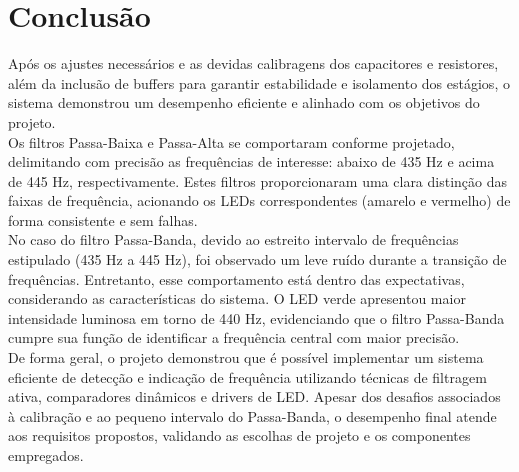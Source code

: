 \documentclass[a4paper, 12pt]{article}
\begin{document}






\newpage
\section{Conclusão}

Após os ajustes necessários e as devidas calibragens dos capacitores e resistores, além da inclusão de buffers para garantir estabilidade e isolamento dos estágios, o sistema demonstrou um desempenho eficiente e alinhado com os objetivos do projeto. \\

Os filtros Passa-Baixa e Passa-Alta se comportaram conforme projetado, delimitando com precisão as frequências de interesse: abaixo de 435 Hz e acima de 445 Hz, respectivamente. Estes filtros proporcionaram uma clara distinção das faixas de frequência, acionando os LEDs correspondentes (amarelo e vermelho) de forma consistente e sem falhas.\\

No caso do filtro Passa-Banda, devido ao estreito intervalo de frequências estipulado (435 Hz a 445 Hz), foi observado um leve ruído durante a transição de frequências. Entretanto, esse comportamento está dentro das expectativas, considerando as características do sistema. O LED verde apresentou maior intensidade luminosa em torno de 440 Hz, evidenciando que o filtro Passa-Banda cumpre sua função de identificar a frequência central com maior precisão.\\

De forma geral, o projeto demonstrou que é possível implementar um sistema eficiente de detecção e indicação de frequência utilizando técnicas de filtragem ativa, comparadores dinâmicos e drivers de LED. Apesar dos desafios associados à calibração e ao pequeno intervalo do Passa-Banda, o desempenho final atende aos requisitos propostos, validando as escolhas de projeto e os componentes empregados.


\newpage
    \nocite{*}
    
    
\end{document}
